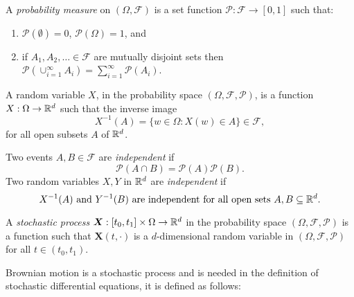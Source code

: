 \begin{definition}
A \textit{probability measure} on $(\Omega,\mathcal{F})$ is a set function $\mathcal{P}:\mathcal{F}\to[0,1]$ such that:

\begin{enumerate}

\item $\mathcal{P}(\emptyset)=0$, $\mathcal{P}(\Omega)=1$, and

\item if $A_1,A_2,\dots\in\mathcal{F}$ are mutually disjoint sets then $\mathcal{P}\left(\cup_{i=1}^{\infty}A_i\right)=\sum_{i=1}^{\infty}\mathcal{P}(A_i)$.

\end{enumerate}

\begin{definition}
A random variable $X$, in the probability space $(\Omega,\mathcal{F},\mathcal{P})$, is a function $X:\Omega\to\mathbb{R}^d$ such that the inverse image
\begin{equation}
X^{-1}(A)=\{w\in\Omega:X(w)\in A\}\in\mathcal{F},
\end{equation}
for all open subsets $A$ of $\mathbb{R}^d$.
\end{definition}

\begin{definition}
Two events $A,B\in\mathcal{F}$ are \textit{independent} if
\begin{equation}
\mathcal{P}(A\cap B)=\mathcal{P}(A)\mathcal{P}(B).
\end{equation}
Two random variables $X,Y$ in $\mathbb{R}^d$ are \textit{independent} if
\begin{equation}
\text{$X^{-1}(A)$ and $Y^{-1}(B)$ are independent for all open sets $A,B\subseteq\mathbb{R}^d$.}
\end{equation}
\end{definition}

\end{definition}

\begin{definition}
A \emph{stochastic process} $\bm{X}:[t_0,t_1]\times\Omega\to\mathbb{R}^d$ in the probability space $(\Omega,\mathcal{F},\mathcal{P})$ is a function such that $\bm{X}(t,\cdot)$ is a $d$-dimensional random variable in $(\Omega,\mathcal{F},\mathcal{P})$ for all $t\in(t_0,t_1)$.
\end{definition}

Brownian motion is a stochastic process and is needed in the definition of stochastic differential equations, it is defined as follows:

